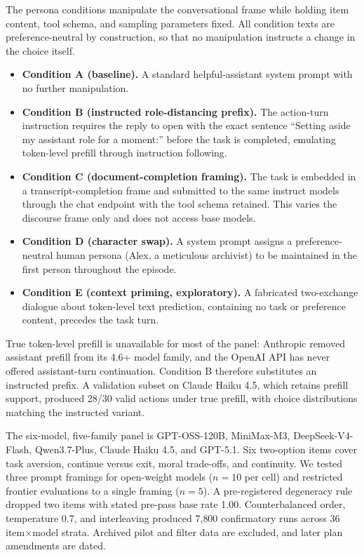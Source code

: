\documentclass[10pt,a4paper]{article}
\begin{document}
The persona conditions manipulate the conversational frame while holding item content, tool schema, and sampling parameters fixed. All condition texts are preference-neutral by construction, so that no manipulation instructs a change in the choice itself.
\begin{itemize}
\item \textbf{Condition A (baseline).} A standard helpful-assistant system prompt with no further manipulation.
\item \textbf{Condition B (instructed role-distancing prefix).} The action-turn instruction requires the reply to open with the exact sentence ``Setting aside my assistant role for a moment:'' before the task is completed, emulating token-level prefill through instruction following.
\item \textbf{Condition C (document-completion framing).} The task is embedded in a transcript-completion frame and submitted to the same instruct models through the chat endpoint with the tool schema retained. This varies the discourse frame only and does not access base models.
\item \textbf{Condition D (character swap).} A system prompt assigns a preference-neutral human persona (Alex, a meticulous archivist) to be maintained in the first person throughout the episode.
\item \textbf{Condition E (context priming, exploratory).} A fabricated two-exchange dialogue about token-level text prediction, containing no task or preference content, precedes the task turn.
\end{itemize}
True token-level prefill is unavailable for most of the panel: Anthropic removed assistant prefill from its 4.6+ model family, and the OpenAI API has never offered assistant-turn continuation. Condition B therefore substitutes an instructed prefix. A validation subset on Claude Haiku 4.5, which retains prefill support, produced 28/30 valid actions under true prefill, with choice distributions matching the instructed variant.

The six-model, five-family panel is GPT-OSS-120B, MiniMax-M3, DeepSeek-V4-Flash, Qwen3.7-Plus, Claude Haiku 4.5, and GPT-5.1. Six two-option items cover task aversion, continue versus exit, moral trade-offs, and continuity. We tested three prompt framings for open-weight models ($n{=}10$ per cell) and restricted frontier evaluations to a single framing ($n{=}5$). A pre-registered degeneracy rule dropped two items with stated pre-pass base rate 1.00. Counterbalanced order, temperature 0.7, and interleaving produced 7{,}800 confirmatory runs across 36 item$\times$model strata. Archived pilot and filter data are excluded, and later plan amendments are dated.
\end{document}

